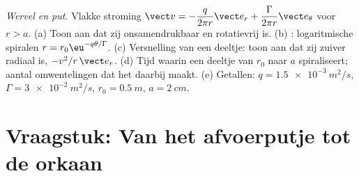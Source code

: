 \begin{exercise}[$\star\star\star$]\label{exo:b2:fluid-kinematics:12}
\emph{Wervel en put.} Vlakke stroming
$\vect v = -\dfrac{q}{2\pi r}\vect e_r +
\dfrac{\Gamma}{2\pi r}\vect e_\theta$
voor $r > a$. (a) Toon aan dat zij onsamendrukbaar en rotatievrij is. (b)
: logaritmische spiralen $r = r_0\eu^{-q\theta/\Gamma}$. (c)
Versnelling van een deeltje: toon aan dat zij zuiver radiaal is,
$-v^2/r\,\vect e_r$. (d) Tijd waarin een deeltje van $r_0$ naar $a$
spiraliseert; aantal omwentelingen dat het daarbij maakt. (e) Getallen:
$q =
\qty{1.5e-3}{m^2/s}$, $\Gamma = \qty{3e-2}{m^2/s}$,
$r_0 = \qty{0.5}{m}$, $a = \qty{2}{cm}$.
\end{exercise}

\section{Vraagstuk: Van het afvoerputje tot de orkaan}


